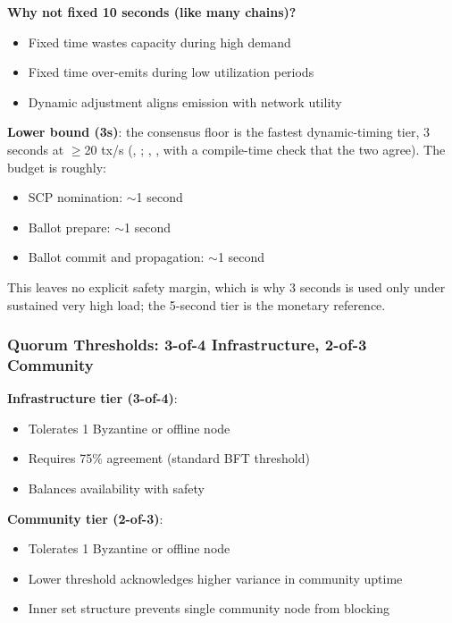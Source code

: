 \textbf{Why not fixed 10 seconds (like many chains)?}
\begin{itemize}
  \item Fixed time wastes capacity during high demand
  \item Fixed time over-emits during low utilization periods
  \item Dynamic adjustment aligns emission with network utility
\end{itemize}

\textbf{Lower bound (3s)}: the consensus floor is the fastest dynamic-timing
tier, 3 seconds at $\geq$20 tx/s (,
; ,
, with a compile-time check that the two agree).
The budget is roughly:
\begin{itemize}
  \item SCP nomination: $\sim$1 second
  \item Ballot prepare: $\sim$1 second
  \item Ballot commit and propagation: $\sim$1 second
\end{itemize}
This leaves no explicit safety margin, which is why 3 seconds is used only
under sustained very high load; the 5-second tier is the monetary reference.

\subsubsection{Quorum Thresholds: 3-of-4 Infrastructure, 2-of-3 Community}

\textbf{Infrastructure tier (3-of-4)}:
\begin{itemize}
  \item Tolerates 1 Byzantine or offline node
  \item Requires 75\% agreement (standard BFT threshold)
  \item Balances availability with safety
\end{itemize}

\textbf{Community tier (2-of-3)}:
\begin{itemize}
  \item Tolerates 1 Byzantine or offline node
  \item Lower threshold acknowledges higher variance in community uptime
  \item Inner set structure prevents single community node from blocking
\end{itemize}

